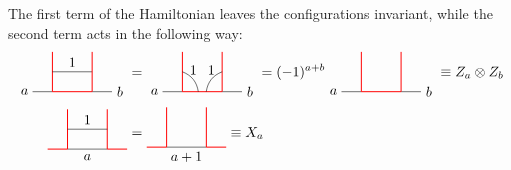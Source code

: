 The first term of the Hamiltonian leaves the configurations invariant, while the second term acts in the following way:
	\begin{align}
		\begin{tikzpicture}[scale=1,baseline=(current bounding box.center)]
			\draw (-0.5,0) -- (0,0);
			\draw [red, line width=0.25mm] (0,0) -- (1,0);
			\draw (1,0) -- (1.5,0);
			\draw [red, line width=0.25mm] (0,0) -- (0,1);
			\draw (0,0.5) to node[above] {$1$} (1,0.5);
			\draw [red, line width=0.25mm] (1,0) -- (1,1);
			\node at (-0.7,0) {$a$};
			\node at (1.7,0) {$b$};
		\end{tikzpicture}&=
		\begin{tikzpicture}[scale=1,baseline=(current bounding box.center)]
			\draw (-0.5,0) -- (0,0);
			\draw [red, line width=0.25mm] (0,0) -- (1,0);
			\draw (1,0) -- (1.5,0);
			\draw [red, line width=0.25mm] (0,0) -- (0,1);
			\draw [red, line width=0.25mm] (1,0) -- (1,1);
			\node at (-0.7,0) {$a$};
			\node at (1.7,0) {$b$};
			\draw (0,0.5) to[bend left] node[above] {$1$} (0.4,0);
			\draw (1,0.5) to[bend right] node[above] {$1$} (0.6,0);
		\end{tikzpicture}=(-1)^{a+b}
		\begin{tikzpicture}[scale=1,baseline=(current bounding box.center)]
			\draw (-0.5,0) -- (0,0);
			\draw [red, line width=0.25mm] (0,0) -- (1,0);
			\draw (1,0) -- (1.5,0);
			\draw [red, line width=0.25mm] (0,0) -- (0,1);
			\draw [red, line width=0.25mm] (1,0) -- (1,1);
			\node at (-0.7,0) {$a$};
			\node at (1.7,0) {$b$};
		\end{tikzpicture}\equiv Z_a\otimes Z_b\\
		\begin{tikzpicture}[scale=1,baseline=(current bounding box.center)]
			\draw [red, line width=0.25mm] (-0.5,0) -- (0,0);
			\draw (0,0) to node[below] {$a$} (1,0);
			\draw [red, line width=0.25mm] (1,0) -- (1.5,0);
			\draw [red, line width=0.25mm] (0,0) -- (0,1);
			\draw [red, line width=0.25mm] (1,0) -- (1,1);
			\draw (0,0.5) to node[above] {$1$} (1,0.5);
		\end{tikzpicture}&=
		\begin{tikzpicture}[scale=1,baseline=(current bounding box.center)]
			\draw [red, line width=0.25mm] (-0.5,0) -- (0,0);
			\draw (0,0) to node[below] {$a+1$} (1,0);
			\draw [red, line width=0.25mm] (1,0) -- (1.5,0);
			\draw [red, line width=0.25mm] (0,0) -- (0,1);
			\draw [red, line width=0.25mm] (1,0) -- (1,1);
		\end{tikzpicture}\equiv X_a
	\end{align}
